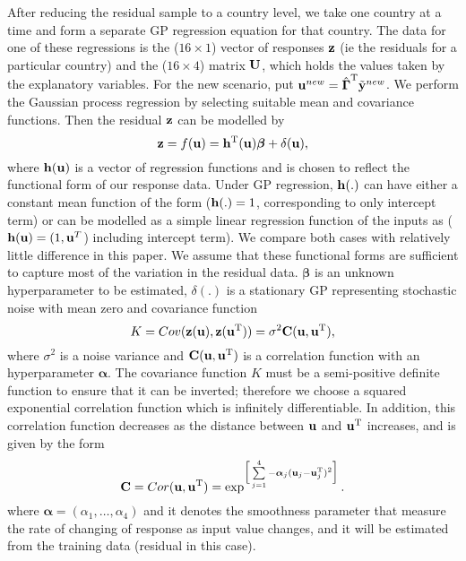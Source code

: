 After reducing the residual sample to a country level, we take one country at a time and form a separate GP regression equation for that country. The data for one of these regressions is the ($16 \times 1$) vector of responses ${\bf z}$ (ie the residuals for a particular country) and the ($16\times 4$) matrix ${\bf U}$, which holds the values taken by the explanatory variables. For the new scenario, put ${\bf u}^{new}= {\hat{\boldsymbol{\Gamma}}}^{\rm T} {\tilde {\bf y}}^{new}$. We perform the Gaussian process regression by selecting suitable mean and covariance functions. Then the residual ${\bf z}$ can be modelled by
\begin{equation}\label{eqgp3}
{\bf z}=f({\bf u})= {\bf h}^{\rm T}({\bf u})\boldsymbol\beta+ \delta({\bf u}),
\end{equation}
where ${\bf h}({\bf u})$ is a vector of regression functions and is chosen to reflect the functional form of our response data. Under GP regression, ${\bf h}(.)$ can have either a constant mean function of the form (${\bf h}(.) = 1$, corresponding to only intercept term) or can be modelled as a simple linear regression function of the inputs as (${\bf h}({\bf u}) = (1,{\bf u}^T$) including intercept term). We compare both cases with relatively little difference in this paper. We assume that these functional forms are sufficient to capture most of the variation in the residual data. $\boldsymbol\beta$ is an unknown hyperparameter to be estimated, $\delta(.)$ is a stationary GP representing stochastic noise with mean zero and covariance function $$ K={Cov({\bf z}({\bf u}),{\bf z}({\bf u}^{\rm T}))=\sigma^{2} {\bf C}({\bf u},{\bf u}^{\rm T})},$$ where $\sigma^{2}$ is a noise variance and ${\bf C}({\bf u},{\bf u}^{\rm T})$ is a correlation function with an hyperparameter $\boldsymbol \alpha$. The covariance function $K$ must be a semi-positive definite function to ensure that it can be inverted; therefore we choose a squared exponential correlation function which is infinitely differentiable. In addition, this correlation function decreases as the distance between ${\bf u}$ and ${\bf u}^{\rm T}$ increases, and is given by the form 
\begin{equation}
{\bf C}=Cor({\bf u},{\bf u}^{\rm T})=\exp^{\Big[\sum \limits_{j=1}^{4}{-\boldsymbol \alpha_j({\bf u}_{j}-{\bf u}^{\rm T}_{j})^2}\Big]}.
\end{equation}
where $\boldsymbol \alpha=(\alpha_1,\ldots,\alpha_4)$ and it denotes the smoothness parameter that measure the rate of changing of response as input value changes, and it will be estimated from the training data (residual in this case). 

